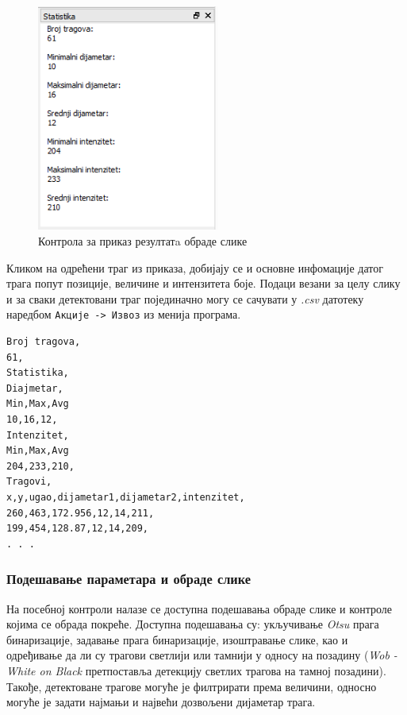 \documentclass[11pt,a4paper,serbian,oneside]{book}
\begin{document}
\begin{figure}[H]
\begin{center}
\includegraphics[width=60mm]{images/stats.png}
\end{center}
\caption{Контрола за приказ резултатa обраде слике}
\label{fig:stats}
\end{figure}

Кликом на одрећени траг из приказа, добијају се и основне инфомације датог трага попут позиције, величине и интензитета боје. Подаци везани за целу слику и за сваки детектовани траг појединачно могу се сачувати у \textit{.csv} датотеку наредбом \texttt{Акције -> Извоз} из менија програма. 

\begin{lstlisting}[language=Xml,label=lst:stats,caption=Пример сачуваних резултата]
Broj tragova,
61,
Statistika,
Diajmetar,
Min,Max,Avg
10,16,12,
Intenzitet,
Min,Max,Avg
204,233,210,
Tragovi,
x,y,ugao,dijametar1,dijametar2,intenzitet,
260,463,172.956,12,14,211,
199,454,128.87,12,14,209,
. . .
\end{lstlisting}

\subsubsection{Подешавање параметара и обраде слике}

На посебној контроли налазе се доступна подешавања обраде слике и контроле којима се обрада покреће.
Доступна подешавања су: укључивање \textit{Otsu} прага бинаризације, задавање прага бинаризације, изоштравање слике, као и одређивање да ли су трагови светлији или тамнији у односу на позадину (\textit{Wob - White on Black} претпоставља детекцију светлих трагова на тамној позадини). Такође, детектоване трагове могуће је филтрирати према величини, односно могуће је задати најмањи и највећи дозвољени дијаметар трага. 
\end{document}
